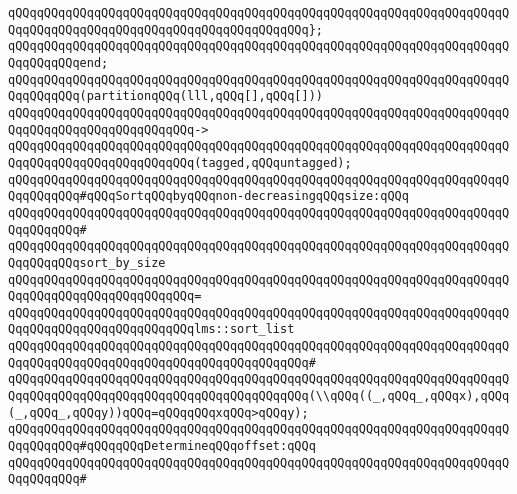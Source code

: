 \verb|qQQqqQQqqQQqqQQqqQQqqQQqqQQqqQQqqQQqqQQqqQQqqQQqqQQqqQQqqQQqqQQqqQQqqQQqqQQqqQQqqQQqqQQqqQQqqQQqqQQqqQQqqQQqqQQq};|\newline
\verb|qQQqqQQqqQQqqQQqqQQqqQQqqQQqqQQqqQQqqQQqqQQqqQQqqQQqqQQqqQQqqQQqqQQqqQQqqQQqqQQqend;|\newline
\newline
\newline
\verb|qQQqqQQqqQQqqQQqqQQqqQQqqQQqqQQqqQQqqQQqqQQqqQQqqQQqqQQqqQQqqQQqqQQqqQQqqQQqqQQq(partitionqQQq(lll,qQQq[],qQQq[]))|\newline
\verb|qQQqqQQqqQQqqQQqqQQqqQQqqQQqqQQqqQQqqQQqqQQqqQQqqQQqqQQqqQQqqQQqqQQqqQQqqQQqqQQqqQQqqQQqqQQqqQQq->|\newline
\verb|qQQqqQQqqQQqqQQqqQQqqQQqqQQqqQQqqQQqqQQqqQQqqQQqqQQqqQQqqQQqqQQqqQQqqQQqqQQqqQQqqQQqqQQqqQQqqQQq(tagged,qQQquntagged);|\newline
\newline
\newline
\verb|qQQqqQQqqQQqqQQqqQQqqQQqqQQqqQQqqQQqqQQqqQQqqQQqqQQqqQQqqQQqqQQqqQQqqQQqqQQqqQQq#qQQqSortqQQqbyqQQqnon-decreasingqQQqsize:qQQq|\newline
\verb|qQQqqQQqqQQqqQQqqQQqqQQqqQQqqQQqqQQqqQQqqQQqqQQqqQQqqQQqqQQqqQQqqQQqqQQqqQQqqQQq#|\newline
\verb|qQQqqQQqqQQqqQQqqQQqqQQqqQQqqQQqqQQqqQQqqQQqqQQqqQQqqQQqqQQqqQQqqQQqqQQqqQQqqQQqsort_by_size|\newline
\verb|qQQqqQQqqQQqqQQqqQQqqQQqqQQqqQQqqQQqqQQqqQQqqQQqqQQqqQQqqQQqqQQqqQQqqQQqqQQqqQQqqQQqqQQqqQQqqQQq=|\newline
\verb|qQQqqQQqqQQqqQQqqQQqqQQqqQQqqQQqqQQqqQQqqQQqqQQqqQQqqQQqqQQqqQQqqQQqqQQqqQQqqQQqqQQqqQQqqQQqqQQqlms::sort_list|\newline
\verb|qQQqqQQqqQQqqQQqqQQqqQQqqQQqqQQqqQQqqQQqqQQqqQQqqQQqqQQqqQQqqQQqqQQqqQQqqQQqqQQqqQQqqQQqqQQqqQQqqQQqqQQqqQQqqQQq#|\newline
\verb|qQQqqQQqqQQqqQQqqQQqqQQqqQQqqQQqqQQqqQQqqQQqqQQqqQQqqQQqqQQqqQQqqQQqqQQqqQQqqQQqqQQqqQQqqQQqqQQqqQQqqQQqqQQqqQQq(\\qQQq((_,qQQq_,qQQqx),qQQq(_,qQQq_,qQQqy))qQQq=qQQqqQQqxqQQq>qQQqy);|\newline
\newline
\newline
\verb|qQQqqQQqqQQqqQQqqQQqqQQqqQQqqQQqqQQqqQQqqQQqqQQqqQQqqQQqqQQqqQQqqQQqqQQqqQQqqQQq#qQQqqQQqDetermineqQQqoffset:qQQq|\newline
\verb|qQQqqQQqqQQqqQQqqQQqqQQqqQQqqQQqqQQqqQQqqQQqqQQqqQQqqQQqqQQqqQQqqQQqqQQqqQQqqQQq#|\newline
